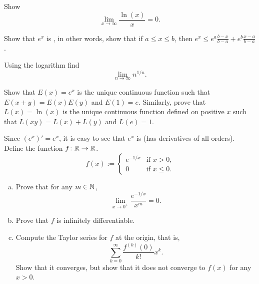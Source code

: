 \begin{exercise}
Show
\begin{equation*}
\lim_{x\to\infty} \frac{\ln(x)}{x} = 0 .
\end{equation*}
\end{exercise}

\begin{exercise}
Show that $e^x$ is \emph{}, in other words, show that 
if $a \leq x \leq b$, then
$e^x \leq e^a \frac{b-x}{b-a} + e^b \frac{x-a}{b-a}$.
\end{exercise}

\begin{exercise}
Using the logarithm find
\begin{equation*}
\lim_{n\to\infty} n^{1/n} .
\end{equation*}
\end{exercise}

\begin{exercise}
Show that $E(x) = e^x$ is the unique continuous function such that
$E(x+y) = E(x)E(y)$ and $E(1) = e$.   Similarly, prove that $L(x) = \ln(x)$
is the unique continuous
function defined on positive $x$ such that $L(xy) = L(x)+L(y)$
and $L(e) = 1$.
\end{exercise}

\begin{exercise}\label{exercise:nonanalytic}
Since $(e^x)' = e^x$, it is easy to see that $e^x$ is
(has derivatives of all orders).  Define the function $f \colon {\mathbb{R}} \to {\mathbb{R}}$.
\begin{equation*}
f(x) := \begin{cases}
e^{-1/x} & \text{if $x > 0$,} \\
0 & \text{if $x \leq 0$}.
\end{cases}
\end{equation*}
\begin{enumerate}[a)]
\item
Prove that for any $m \in {\mathbb{N}}$,
\begin{equation*}
\lim_{x \to 0^+} \frac{e^{-1/x}}{x^m} = 0 .
\end{equation*}
\item
Prove that $f$ is infinitely differentiable.
\item
Compute the Taylor series for $f$ at the origin, that is,
\begin{equation*}
\sum_{k=0}^\infty
\frac{f^{(k)}(0)}{k!}x^k .
\end{equation*}
Show that it converges, but show that it does not converge to $f(x)$
for any $x > 0$.
\end{enumerate}
\end{exercise}

